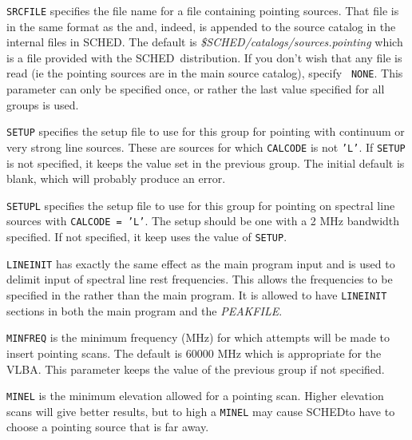 \documentclass{report}
\newcommand{\sched}{{\sc SCHED}}
\newcommand{\schedb}{{\sc SCHED~}}
\begin{document}
\begin{list}{}{\parsep 0em  \itemsep 0em }

\item {\tt SRCFILE} specifies the file name for a file containing
pointing sources.  That file is in the same format as the
 and, indeed, is appended to
the source catalog in the internal files in \sched.  The default is
{\sl \$SCHED/catalogs/sources.pointing} which is a file provided with
the \schedb distribution.  If you don't wish that any file is read (ie
the pointing sources are in the main source catalog), specify {\tt
NONE}.  This parameter can only be specified once, or rather the last
value specified for all groups is used.

\item {\tt SETUP} specifies the setup file to use for this group for
pointing with continuum or very strong line sources.  These are
sources for which {\tt CALCODE} is not {\tt 'L'}.  If {\tt SETUP} is
not specified, it keeps the value set in the previous group.  The
initial default is blank, which will probably produce an error.

\item {\tt SETUPL} specifies the setup file to use for this group for
pointing on spectral line sources with {\tt CALCODE = 'L'}.  The setup
should be one with a 2 MHz bandwidth specified.  If not specified, it
keep uses the value of {\tt SETUP}.

\item {\tt LINEINIT} has exactly the same effect as the main program
input  and is used to delimit
input of spectral line rest frequencies.  This allows the frequencies
to be specified in the  rather
than the main program.  It is allowed to have {\tt LINEINIT} sections
in both the main program and the {\sl PEAKFILE}.

\item {\tt MINFREQ} is the minimum frequency (MHz) for which attempts will
be made to insert pointing scans.  The default is 60000 MHz which is
appropriate for the VLBA.  This parameter keeps the value of the previous
group if not specified.

\item {\tt MINEL} is the minimum elevation allowed for a pointing scan.
Higher elevation scans will give better results, but to high a {\tt MINEL}
may cause \sched to have to choose a pointing source that is far away.


\end{list}
\end{document}
